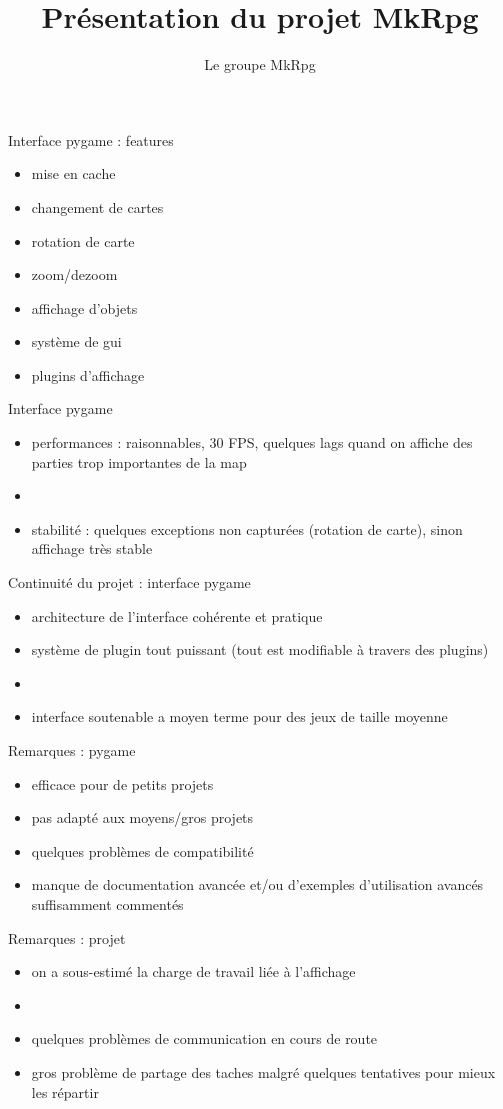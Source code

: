\documentclass[11pt]{beamer}
\author{Le groupe MkRpg}
\title{Présentation du projet MkRpg}
\begin{document}
\begin{frame}{Interface pygame : features}
	\begin{itemize}
		\item mise en cache
    \item changement de cartes
    \item rotation de carte
    \item zoom/dezoom
    \item affichage d'objets
    \item système de gui
    \item plugins d'affichage
	\end{itemize}
\end{frame}

\begin{frame}{Interface pygame}
	\begin{itemize}
    \item performances : raisonnables, 30 FPS, quelques lags quand on affiche des parties trop importantes de la map
		\item[]
    \item stabilité : quelques exceptions non capturées (rotation de carte), sinon affichage très stable
	\end{itemize}
\end{frame}

\begin{frame}{Continuité du projet : interface pygame}
	\begin{itemize}
		\item architecture de l'interface cohérente et pratique
		\item système de plugin tout puissant (tout est modifiable à travers des plugins)
		\item[]
		\item interface soutenable a moyen terme pour des jeux de taille moyenne
	\end{itemize}
\end{frame}

\begin{frame}{Remarques : pygame}
	\begin{itemize}
		\item efficace pour de petits projets
		\item pas adapté aux moyens/gros projets
		\item quelques problèmes de compatibilité
		\item manque de documentation avancée et/ou d'exemples d'utilisation avancés suffisamment commentés
	\end{itemize}
\end{frame}

\begin{frame}{Remarques : projet}
	\begin{itemize}
		\item on a sous-estimé la charge de travail liée à l'affichage
		\item[]
		\item quelques problèmes de communication en cours de route
		\item gros problème de partage des taches malgré quelques tentatives pour mieux les répartir
	\end{itemize}
\end{frame}
\end{document}
